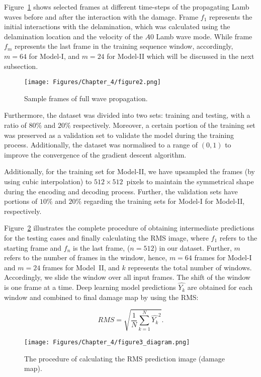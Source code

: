 Figure~\ref{fig:Full_wave} shows selected frames at different time-steps of the propagating Lamb waves before and after the interaction with the damage.
Frame \(f_{1}\) represents the initial interactions with the delamination, which was calculated using the delamination location and the velocity of the \(A0\) Lamb wave mode.
While frame \(f_{m}\) represents the last frame in the training sequence window, accordingly, \(m=64\) for Model-I, and \(m=24\) for Model-II which will be discussed in the next subsection.
\begin{figure}[!h]
	\centering
	\texttt{[image: Figures/Chapter\_4/figure2.png]}
	\caption{Sample frames of full wave propagation.}
	\label{fig:Full_wave}
\end{figure}

Furthermore, the dataset was divided into two sets: training and testing, with a ratio of \(80\%\) and \(20\% \) respectively.
Moreover, a certain portion of the training set was preserved as a validation set to validate the model during the training process.
Additionally, the dataset was normalised to a range of \((0, 1)\) to improve the convergence of the gradient descent algorithm.

Additionally, for the training set for Model-II, we have upsampled the frames (by using cubic interpolation) to \(512\times512\)~pixels to maintain the symmetrical shape during the encoding and decoding process.
Further, the validation sets have portions of \(10\%\) and \(20\%\) regarding the training sets for Model-I for Model-II, respectively.

Figure~\ref{fig:Diagram_exp_predictions} illustrates the complete procedure of obtaining intermediate predictions for the testing cases and finally calculating the RMS image, where \(f_{1}\) refers to the starting frame and \(f_{n}\) is the last frame, (\(n=512\)) in our dataset.
Further, \(m\) refers to the number of frames in the window, hence, \(m=64\) frames for Model-I and \(m=24\) frames for Model~II, and \(k\) represents the total number of windows.
Accordingly, we slide the window over all input frames.
The shift of the window is one frame at a time.
Deep learning model predictions \(\hat{Y_k}\) are obtained for each window and combined to final damage map by using the RMS:

\begin{equation}
	RMS = \sqrt{\frac{1}{N}\sum_{k=1}^{N}\hat{Y_k}^2}.	
	\label{RMS}
\end{equation}
\begin{figure}[!h]
	\centering
	\texttt{[image: Figures/Chapter\_4/figure3\_diagram.png]}
	\caption{The procedure of calculating the RMS prediction image (damage map).}
	\label{fig:Diagram_exp_predictions}
\end{figure}
